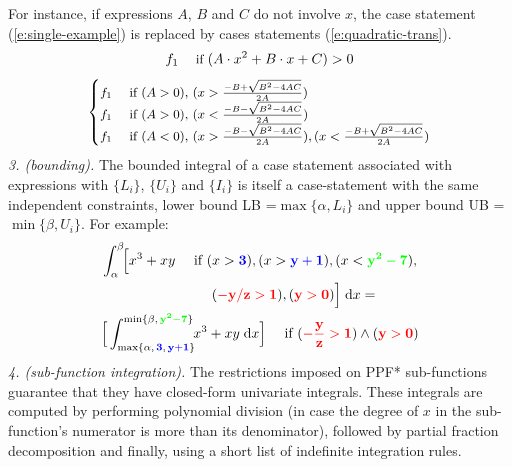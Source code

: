 \documentclass[]{article}
\newcommand{\case}[2]{#2 &\text{ if } #1}%
\newcommand{\singlecase}[2]{#2 \quad \text{ if } #1}
\newcommand{\dd}{\;\mathrm{d}} %
\begin{document}
For instance, if expressions {\footnotesize$A$}, {\footnotesize$B$} and {\footnotesize$C$} do not involve $x$,
the case statement (\ref{e:single-example})
is replaced by cases statements (\ref{e:quadratic-trans}).
\begin{equation}\footnotesize
\label{e:single-example}
\singlecase{(A \cdot x^2 + B \cdot x + C)>0}{f_1}
\end{equation}
\begin{align}\footnotesize
\label{e:quadratic-trans}
{
\begin{cases}
  \case{(A>0), \, (x> \frac{-B + \sqrt{B^2 - 4 A C}}{2 A}) }{f_1} \\ 
  \case{(A>0), \, (x< \frac{-B - \sqrt{B^2 - 4 A C}}{2 A}) }{f_1} \\ 
  \case{(A<0), \, (x> \frac{-B - \sqrt{B^2 - 4 A C}}{2 A}),
                              (x< \frac{-B + \sqrt{B^2 - 4 A C}}{2 A})}{f_1}
 \end{cases}
}
\end{align}
\emph{3. (bounding).} The bounded integral of a case statement 
associated with expressions with $\{L_i\}$, $\{U_i\}$ and $\{I_i\}$ 
is itself a case-statement with the same independent constraints,
 lower bound LB =$\max\{\alpha, L_i\}$ and 
 upper bound UB =$ \min\{\beta, U_i\}$.
For example:
\begin{align*}\footnotesize 
&\int_{\alpha}^{\beta}\!\! \Big[
\singlecase{(x>{\bf\color{blue}3}), (x>{\bf\color{blue}y+1}), (x<{\bf\color{green}y^2-7}), \\ 
&\hspace{28mm} ({\bf\color{red}-y/z > 1}) , ({\bf\color{red}y>0})}
{x^3 + xy} \Big] \dd x = \\
&\singlecase{({\bf\color{red}-\frac{y}{z} > 1}) \wedge ({\bf\color{red}y>0})}
{\Big[ \int_{\max\{\alpha, \,{\bf {\color{blue}3}, \, {\color{blue}y+1}}\}}^{\min\{\beta, \, {\bf\color{green} y^2 - 7}\}} \!\! x^3 + xy \dd x \Big]} 
\end{align*}  
\emph{4. (sub-function integration).} %
The restrictions imposed on PPF* sub-functions 
guarantee that they have closed-form %
univariate integrals.
These integrals are computed by performing polynomial division 
(in case the degree of $x$ in the sub-function's numerator is more than its denominator),
followed by partial fraction decomposition and finally, using a short list of indefinite integration rules.
\end{document}
